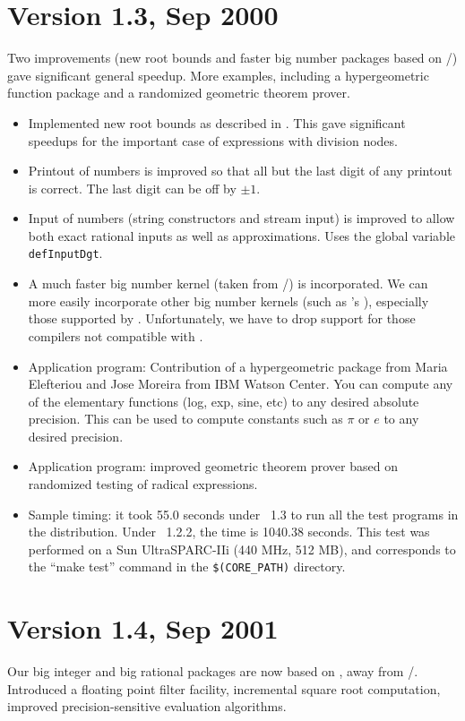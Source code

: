 \documentclass[12pt]{article}
\begin{document}
\section{Version 1.3, Sep 2000}
Two improvements (new root bounds
and faster big number packages based on \lidia/\cln)
gave significant general speedup.  
More examples, including a hypergeometric function package
and a randomized geometric theorem prover.

	\begin{itemize}
	\item
	Implemented new root bounds as described in
	\cite{li-yap:constructiveBound:00}.  This 
	gave significant speedups for the important case
	of expressions with division nodes.
	\item
	Printout of numbers is improved so that all but the last digit
	of any printout is correct.
	The last digit can be off by $\pm 1$.
	\item
	Input of numbers (string constructors and stream input) is
	improved to allow both exact rational inputs as well as
	approximations.  Uses the global variable {\tt defInputDgt}.
	\item
	 A much faster big number kernel (taken from
	\lidia/\cln) is incorporated.  We can more easily
	incorporate other big number kernels (such as \gnu's \gmp),
	especially those supported by \lidia.
	Unfortunately, we have to drop support for those compilers not
	compatible with \lidia.
	\item
	Application program:
	Contribution of a hypergeometric package
        from Maria Elefteriou and Jose Moreira from IBM Watson Center.
        You can compute any of the elementary functions (log, exp,
        sine, etc) to any desired absolute precision.  This
	can be used to compute constants such as $\pi$ or $e$ to
	any desired precision.
	\item
	Application program:
	improved geometric theorem prover \cite{tyl:zero-test:00}
	based on randomized testing of radical expressions.
	\item
	Sample timing: it took 55.0 seconds under \core\ 1.3
	to run all the test programs in the distribution.
	Under \core\ 1.2.2, the time is 1040.38 seconds.
	This test was performed on a Sun UltraSPARC-IIi (440 MHz, 512 MB),
	and corresponds to the ``make test''
	command in the {\tt \$(CORE\_PATH)} directory.
	\end{itemize}

\section{Version 1.4, Sep 2001}
Our big integer and big rational packages
are now based on \gmp, away from \lidia/\cln.
Introduced a floating point filter facility,
incremental square root computation,
improved precision-sensitive evaluation algorithms.
\end{document}
